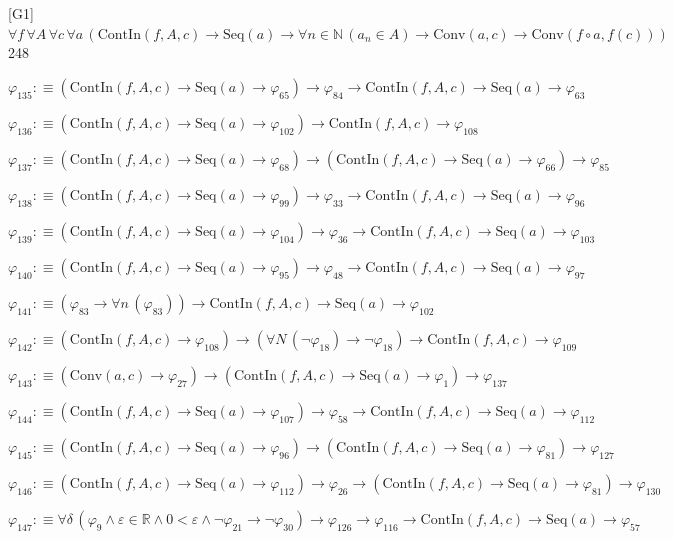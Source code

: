 \begin{fullproof}{[G1]}{$\forall f\,\forall A\,\forall c\,\forall a\,(\mathrm{ContIn}(f,A,c) \to \mathrm{Seq}(a) \to \forall n \in \mathbb{N}\,(a_{n} \in A) \to \mathrm{Conv}(a,c) \to \mathrm{Conv}(f \circ a,f(c)))$}{248}
\begin{abbrevlist}
\item $\varphi_{135} :\equiv (\mathrm{ContIn}(f,A,c) \to \mathrm{Seq}(a) \to \varphi_{65}) \to \varphi_{84} \to \mathrm{ContIn}(f,A,c) \to \mathrm{Seq}(a) \to \varphi_{63}$
\item $\varphi_{136} :\equiv (\mathrm{ContIn}(f,A,c) \to \mathrm{Seq}(a) \to \varphi_{102}) \to \mathrm{ContIn}(f,A,c) \to \varphi_{108}$
\item $\varphi_{137} :\equiv (\mathrm{ContIn}(f,A,c) \to \mathrm{Seq}(a) \to \varphi_{68}) \to (\mathrm{ContIn}(f,A,c) \to \mathrm{Seq}(a) \to \varphi_{66}) \to \varphi_{85}$
\item $\varphi_{138} :\equiv (\mathrm{ContIn}(f,A,c) \to \mathrm{Seq}(a) \to \varphi_{99}) \to \varphi_{33} \to \mathrm{ContIn}(f,A,c) \to \mathrm{Seq}(a) \to \varphi_{96}$
\item $\varphi_{139} :\equiv (\mathrm{ContIn}(f,A,c) \to \mathrm{Seq}(a) \to \varphi_{104}) \to \varphi_{36} \to \mathrm{ContIn}(f,A,c) \to \mathrm{Seq}(a) \to \varphi_{103}$
\item $\varphi_{140} :\equiv (\mathrm{ContIn}(f,A,c) \to \mathrm{Seq}(a) \to \varphi_{95}) \to \varphi_{48} \to \mathrm{ContIn}(f,A,c) \to \mathrm{Seq}(a) \to \varphi_{97}$
\item $\varphi_{141} :\equiv (\varphi_{83} \to \forall n\,(\varphi_{83})) \to \mathrm{ContIn}(f,A,c) \to \mathrm{Seq}(a) \to \varphi_{102}$
\item $\varphi_{142} :\equiv (\mathrm{ContIn}(f,A,c) \to \varphi_{108}) \to (\forall N\,(\neg \varphi_{18}) \to \neg \varphi_{18}) \to \mathrm{ContIn}(f,A,c) \to \varphi_{109}$
\item $\varphi_{143} :\equiv (\mathrm{Conv}(a,c) \to \varphi_{27}) \to (\mathrm{ContIn}(f,A,c) \to \mathrm{Seq}(a) \to \varphi_{1}) \to \varphi_{137}$
\item $\varphi_{144} :\equiv (\mathrm{ContIn}(f,A,c) \to \mathrm{Seq}(a) \to \varphi_{107}) \to \varphi_{58} \to \mathrm{ContIn}(f,A,c) \to \mathrm{Seq}(a) \to \varphi_{112}$
\item $\varphi_{145} :\equiv (\mathrm{ContIn}(f,A,c) \to \mathrm{Seq}(a) \to \varphi_{96}) \to (\mathrm{ContIn}(f,A,c) \to \mathrm{Seq}(a) \to \varphi_{81}) \to \varphi_{127}$
\item $\varphi_{146} :\equiv (\mathrm{ContIn}(f,A,c) \to \mathrm{Seq}(a) \to \varphi_{112}) \to \varphi_{26} \to (\mathrm{ContIn}(f,A,c) \to \mathrm{Seq}(a) \to \varphi_{81}) \to \varphi_{130}$
\item $\varphi_{147} :\equiv \forall \delta\,(\varphi_{9} \land \varepsilon \in \mathbb{R} \land 0 < \varepsilon \land \neg \varphi_{21} \to \neg \varphi_{30}) \to \varphi_{126} \to \varphi_{116} \to \mathrm{ContIn}(f,A,c) \to \mathrm{Seq}(a) \to \varphi_{57}$

\end{abbrevlist}
\end{fullproof}
